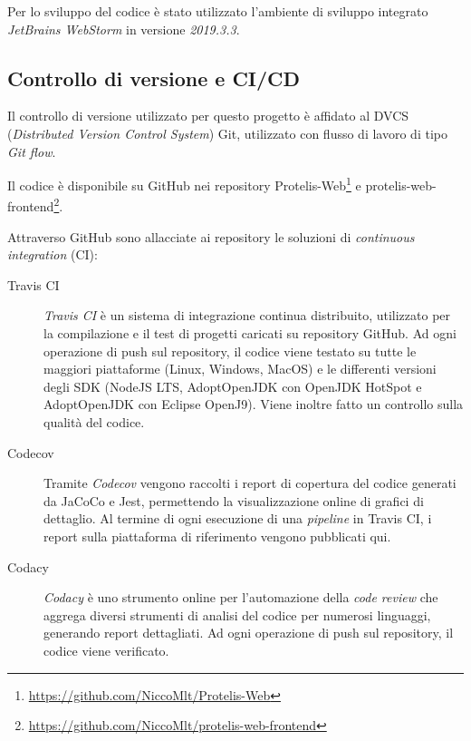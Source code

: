       Per lo sviluppo del codice è stato utilizzato l'ambiente di sviluppo integrato \emph{JetBrains WebStorm} in versione \emph{2019.3.3}.

  \subsection{Controllo di versione e CI/CD}
    Il controllo di versione utilizzato per questo progetto è affidato al DVCS (\emph{\emph{D}istributed \emph{V}ersion \emph{C}ontrol \emph{S}ystem}) Git, utilizzato con flusso di lavoro di tipo \emph{Git flow}.

    Il codice è disponibile su GitHub nei repository Protelis-Web\footnote{\url{https://github.com/NiccoMlt/Protelis-Web}}
    e protelis-web-frontend\footnote{\url{https://github.com/NiccoMlt/protelis-web-frontend}}.

    Attraverso GitHub sono allacciate ai repository le soluzioni di \emph{continuous integration} (CI):

    \begin{description}
      \item[Travis CI]
        \emph{Travis CI} è un sistema di integrazione continua distribuito, utilizzato per la compilazione e il test di progetti caricati su repository GitHub.
        Ad ogni operazione di push sul repository, il codice viene testato su tutte le maggiori piattaforme (Linux, Windows, MacOS) e le differenti versioni degli SDK (NodeJS LTS, AdoptOpenJDK con OpenJDK HotSpot e AdoptOpenJDK con Eclipse OpenJ9).
        Viene inoltre fatto un controllo sulla qualità del codice.

      \item[Codecov]
        Tramite \emph{Codecov} vengono raccolti i report di copertura del codice generati da JaCoCo e Jest, permettendo la visualizzazione online di grafici di dettaglio.
        Al termine di ogni esecuzione di una \emph{pipeline} in Travis CI, i report sulla piattaforma di riferimento vengono pubblicati qui.

      \item[Codacy]
        \emph{Codacy} è uno strumento online per l'automazione della \emph{code review} che aggrega diversi strumenti di analisi del codice per numerosi linguaggi, generando report dettagliati.
        Ad ogni operazione di push sul repository, il codice viene verificato.
    \end{description}

